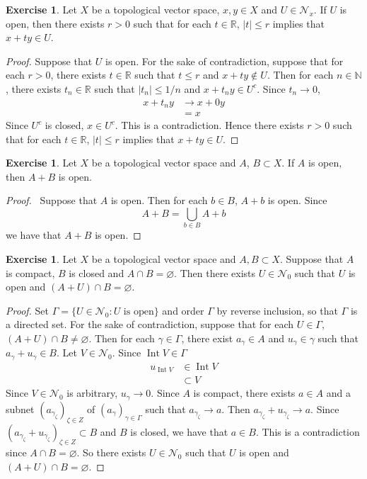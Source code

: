 \documentclass[12pt]{amsart}
\theoremstyle{definition}
\newtheorem{ex}[definition]{Exercise}
\newcommand{\gam}{\gamma}
\newcommand{\Gam}{\Gamma}
\newcommand{\ze}{\zeta}
\newcommand{\N}{\mathbb{N}}
\newcommand{\R}{\mathbb{R}}
\newcommand{\MN}{\mathcal{N}}
\DeclareMathOperator{\Int}{Int}
\DeclareMathOperator*{\0}{\mbf{0}}
\DeclareMathOperator*{\1}{\mbf{1}}
\begin{document}
	\begin{ex}
		Let $X$ be a topological vector space, $x,y \in X$ and $U \in \MN_x$. If $U$ is open, then there exists $r >0$ such that for each $t \in \R$, $|t| \leq r$ implies that $x+ ty \in U$.
	\end{ex}

	\begin{proof}
		Suppose that $U$ is open. For the sake of contradiction, suppose that for each $r > 0$, there exists $t \in \R$ such that $t \leq r$ and $x+ ty \not \in U$. Then for each $n \in \N$, there exists $t_n \in \R$ such that $|t_n| \leq 1/n$ and $x + t_ny \in U^c$. Since $t_n \rightarrow 0$, 
		\begin{align*}
			x + t_ny 
			& \rightarrow x + 0y \\
			&= x
		\end{align*}
		Since $U^c$ is closed, $x \in U^c$. This is a contradiction. Hence there exists $r >0$ such that for each $t \in \R$, $|t| \leq r$ implies that $x+ ty \in U$.
	\end{proof}

	\begin{ex}
		Let $X$ be a topological vector space and $A$, $B \subset X$. If $A$ is open, then $A + B$ is open.
	\end{ex}
	
	\begin{proof} \
		Suppose that $A$ is open. Then for each $b \in B$, $A + b$ is open. Since 
		$$A + B = \bigcup_{b \in B} A + b$$
		we have that $A + B$ is open.
	\end{proof}

	\begin{ex}
		Let $X$ be a topological vector space and $A,B \subset X$. Suppose that $A$ is compact, $B$ is closed and $A \cap B = \varnothing$. Then there exists $U \in \MN_0$ such that $U$ is open and $(A + U) \cap B = \varnothing$. 
	\end{ex}
	
	\begin{proof}
		Set $\Gam = \{U \in \MN_0: U \text{ is open}\}$ and order $\Gam$ by reverse inclusion, so that $\Gam$ is a directed set. For the sake of contradiction, suppose that for each $U \in \Gam$, $(A + U) \cap B \neq \varnothing$. Then for each $\gam \in \Gam$, there exist $a_{\gam} \in A$ and $u_{\gam} \in \gam$ such that $a_{\gam} + u_{\gam} \in B$. Let $V \in \MN_0$. Since $\Int V \in \Gam$
		\begin{align*}
			u_{\Int V} 
			& \in \Int V \\
			& \subset V
		\end{align*}
		Since $V \in \MN_0$ is arbitrary, $u_{\gam} \rightarrow 0$.  Since $A$ is compact, there exists $a \in A$ and a subnet $(a_{\gam_{\ze}})_{\ze \in Z}$ of $(a_{\gam})_{\gam \in \Gam}$ such that $a_{\gam_{\ze}} \rightarrow a$. Then $a_{\gam_{\ze}} + u_{\gam_{\ze}} \rightarrow a$. Since $(a_{\gam_{\ze}} + u_{\gam_{\ze}})_{\ze \in Z} \subset B$ and $B$ is closed, we have that $a \in B$. This is a contradiction since $A \cap B = \varnothing$. So there exists $U \in \MN_0$ such that $U$ is open and $(A+U) \cap B = \varnothing$.
	\end{proof}
\end{document}
